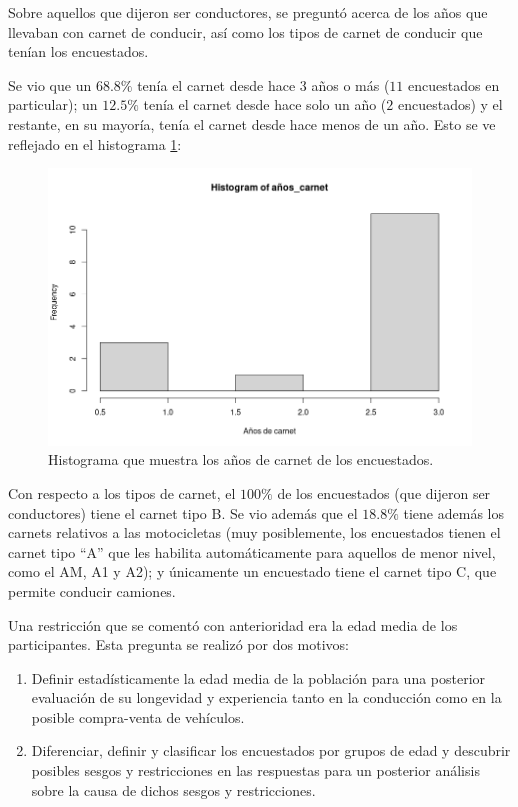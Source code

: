 Sobre aquellos que dijeron ser conductores, se preguntó acerca de los años que
llevaban con carnet de conducir, así como los tipos de carnet de conducir que tenían
los encuestados.

Se vio que un $68.8\%$ tenía el carnet desde hace 3 años o más ($11$ encuestados
en particular); un $12.5\%$ tenía el carnet desde hace solo un año ($2$ encuestados)
y el restante, en su mayoría, tenía el carnet desde hace menos de un año. Esto se ve
reflejado en el histograma \ref{fig:carnet-time-hist}:

\begin{figure}[H]
  \centering
  \includegraphics[width=\linewidth]{images/carnet-time.png}
  \caption{Histograma que muestra los años de carnet de los encuestados.}
  \label{fig:carnet-time-hist}
\end{figure}

Con respecto a los tipos de carnet, el $100\%$ de los encuestados (que dijeron ser
conductores) tiene el carnet tipo B. Se vio además que el $18.8\%$ tiene además los
carnets relativos a las motocicletas (muy posiblemente, los encuestados tienen el
carnet tipo ``A'' que les habilita automáticamente para aquellos de menor nivel,
como el AM, A1 y A2); y únicamente un encuestado tiene el carnet tipo C, que permite
conducir camiones.

Una restricción que se comentó con anterioridad era la edad media de los participantes.
Esta pregunta se realizó por dos motivos:

\begin{enumerate}
  \item Definir estadísticamente la edad media de la población para una posterior evaluación
        de su longevidad y experiencia tanto en la conducción como en la posible
        compra-venta de vehículos.
  \item Diferenciar, definir y clasificar los encuestados por grupos de edad y descubrir
        posibles sesgos y restricciones en las respuestas para un posterior análisis
        sobre la causa de dichos sesgos y restricciones.
\end{enumerate}

